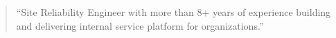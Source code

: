 \documentclass[8pt,a4paper, withhyper]{altacv}
\begin{document}


\makecvheader


\begin{quote}
``Site Reliability Engineer with more than 8+ years of experience building and delivering internal service platform for organizations.''
\end{quote}

\end{document}
